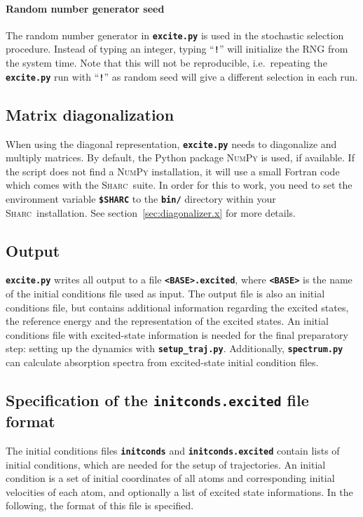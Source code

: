 \documentclass[a4paper,10pt,DIV=15,openany,twoside=false]{scrbook}
\newcommand{\sharc}{\textsc{Sharc}}
\newcommand{\ttt}[1]{\textbf{\texttt{#1}}}
\begin{document}
\paragraph{Random number generator seed}

The random number generator in \ttt{excite.py} is used in the stochastic selection procedure. Instead of typing an integer, typing ``\ttt{!}'' will initialize the RNG from the system time. Note that this will not be reproducible, i.e.\ repeating the \ttt{excite.py} run with ``\ttt{!}'' as random seed will give a different selection in each run.



\subsection{Matrix diagonalization}

When using the diagonal representation, \ttt{excite.py} needs to diagonalize and multiply matrices. By default, the Python package \textsc{NumPy} is used, if available. If the script does not find a \textsc{NumPy} installation, it will use a small Fortran code which comes with the \sharc\ suite. In order for this to work, you need to set the environment variable \ttt{\$SHARC} to the \ttt{bin/} directory within your \sharc\ installation. See section~\ref{sec:diagonalizer.x} for more details.

\subsection{Output}

\ttt{excite.py} writes all output to a file \ttt{<BASE>.excited}, where \ttt{<BASE>} is the name of the initial conditions file used as input. The output file is also an initial conditions file, but contains additional information regarding the excited states, the reference energy and the representation of the excited states. An initial conditions file with excited-state information is needed for the final preparatory step: setting up the dynamics with \ttt{setup\_traj.py}.
Additionally, \ttt{spectrum.py} can calculate absorption spectra from excited-state initial condition files.

\subsection{Specification of the \ttt{initconds.excited} file format}\label{sec:initcondsfile}

The initial conditions files \ttt{initconds} and \ttt{initconds.excited} contain lists of initial conditions, which are needed for the setup of trajectories. An initial condition is a set of initial coordinates of all atoms and corresponding initial velocities of each atom, and optionally a list of excited state informations. In the following, the format of this file is specified.
\end{document}
